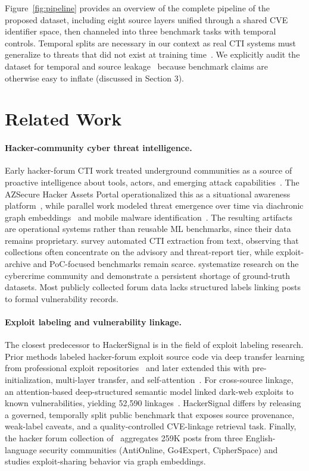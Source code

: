 \documentclass{article}
\begin{document}
\noindent Figure~\ref{fig:pipeline} provides an overview of the complete pipeline of the proposed dataset, including eight source layers unified through a shared CVE identifier space, then channeled into three benchmark tasks with temporal controls. Temporal splits are necessary in our context as real CTI systems must generalize to threats that did not exist at training time~\citep{koh2021wilds}. We explicitly audit the dataset for temporal and source leakage~\citep{kapoor2023leakage} because benchmark claims are otherwise easy to inflate (discussed in Section 3).

\section{Related Work}

\paragraph{Hacker-community cyber threat intelligence.} Early hacker-forum CTI work treated underground communities as a source of proactive intelligence about tools, actors, and emerging attack capabilities~\citep{samtani2015assets, samtani2017jmis}. The AZSecure Hacker Assets Portal operationalized this as a situational awareness platform~\citep{samtani2021hap}, while parallel work modeled threat emergence over time via diachronic graph embeddings~\citep{samtani2020dgef} and mobile malware identification~\citep{grisham2017mobile}. The resulting artifacts are operational systems rather than reusable ML benchmarks, since their data remains proprietary. \citet{rahman2023cti} survey automated CTI extraction from text, observing that collections often concentrate on the advisory and threat-report tier, while exploit-archive and PoC-focused benchmarks remain scarce. \citet{hughes2024cybercrime} systematize research on the cybercrime community and demonstrate a persistent shortage of ground-truth datasets. Most publicly collected forum data lacks structured labels linking posts to formal vulnerability records.

\paragraph{Exploit labeling and vulnerability linkage.}
The closest predecessor to HackerSignal is in the field of exploit labeling research. Prior methods labeled hacker-forum exploit source code via deep transfer learning from professional exploit repositories~\citep{ampel2020dtl} and later extended this with pre-initialization, multi-layer transfer, and self-attention~\citep{ampel2024misq}. For cross-source linkage, an attention-based deep-structured semantic model linked dark-web exploits to known vulnerabilities, yielding 52,590 linkages~\citep{samtani2022eva}. HackerSignal differs by releasing a governed, temporally split public benchmark that exposes source provenance, weak-label caveats, and a quality-controlled CVE-linkage retrieval task. Finally, the hacker forum collection of~\citet{otto2021isi} aggregates 259K posts from three English-language security communities (AntiOnline, Go4Expert, CipherSpace) and studies exploit-sharing behavior via graph embeddings.
\end{document}
